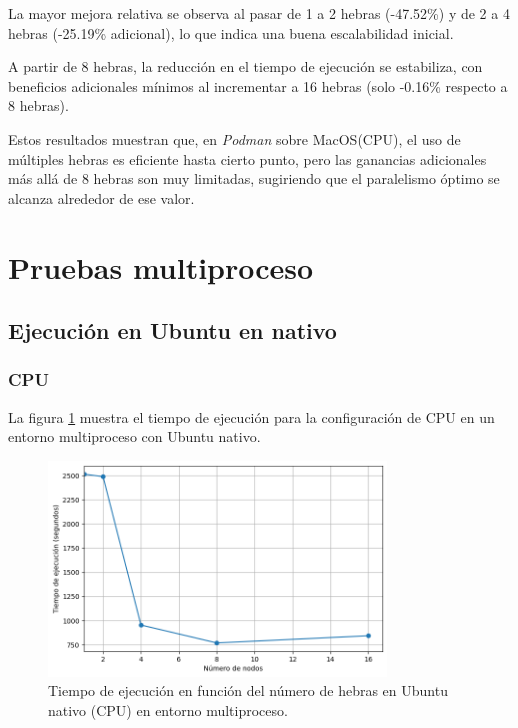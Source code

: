 La mayor mejora relativa se observa al pasar de 1 a 2 hebras (-47.52\%) y de 2 a 4 hebras (-25.19\% adicional), lo que indica una buena escalabilidad inicial.

A partir de 8 hebras, la reducción en el tiempo de ejecución se estabiliza, con beneficios adicionales mínimos al incrementar a 16 hebras (solo -0.16\% respecto a 8 hebras).

Estos resultados muestran que, en \textit{Podman} sobre MacOS(CPU), el uso de múltiples hebras es eficiente hasta cierto punto, pero las ganancias adicionales más allá de 8 hebras son muy limitadas, sugiriendo que el paralelismo óptimo se alcanza alrededor de ese valor.

\section{Pruebas multiproceso}
\subsection{Ejecución en Ubuntu en nativo}
\subsubsection{CPU}

La figura \ref{fig:multi-node_ubuntu_cpu_native_time} muestra el tiempo de ejecución para la configuración de CPU en un entorno multiproceso con Ubuntu nativo.

\begin{figure}[ht]
    \centering
    \includegraphics[width=0.8\textwidth]{imagenes/cap5/multi-node_ubuntu_cpu_native_time.png}
    \caption{Tiempo de ejecución en función del número de hebras en Ubuntu nativo (CPU) en entorno multiproceso.}
    \label{fig:multi-node_ubuntu_cpu_native_time}
\end{figure}

